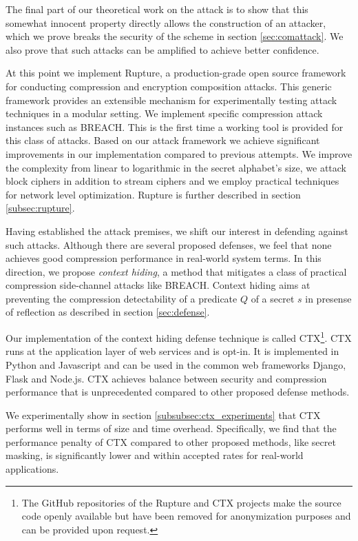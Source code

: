 \documentclass[conference, letterpaper, 10pt]{IEEEtran}
\begin{document}
The final part of our theoretical work on the attack is to show that this
somewhat innocent property directly allows the construction of an attacker,
which we prove breaks the security of the scheme in section
\ref{sec:comattack}. We also prove that such attacks can be amplified to
achieve better confidence.

At this point we implement Rupture\footnotemark[1], a production-grade open
source framework for conducting compression and encryption composition attacks.
This generic framework provides an extensible mechanism for experimentally
testing attack techniques in a modular setting. We implement specific
compression attack instances such as BREACH. This is the first time a working
tool is provided for this class of attacks.  Based on our attack framework we
achieve significant improvements in our implementation compared to previous
attempts. We improve the complexity from linear to logarithmic in the secret
alphabet's size, we attack block ciphers in addition to stream ciphers and we
employ practical techniques for network level optimization.  Rupture is further
described in section \ref{subsec:rupture}.

Having established the attack premises, we shift our interest in defending
against such attacks. Although there are several proposed defenses, we feel that
none achieves good compression performance in real-world system terms. In this
direction, we propose \textit{context hiding}, a method that mitigates a class
of practical compression side-channel attacks like BREACH. Context hiding aims
at preventing the compression detectability of a predicate $Q$ of a secret $s$
in presense of reflection as described in section \ref{sec:defense}.

Our implementation of the context hiding defense technique is called
CTX\footnote[1]{The GitHub repositories of the Rupture and CTX projects make the
source code openly available but have been removed for anonymization purposes
and can be provided upon request.}. CTX runs at the application layer of web
services and is opt-in. It is implemented in Python and Javascript and can be
used in the common web frameworks Django, Flask and Node.js. CTX achieves
balance between security and compression performance that is unprecedented
compared to other proposed defense methods.

We experimentally show in section \ref{subsubsec:ctx_experiments} that CTX
performs well in terms of size and time overhead. Specifically, we find that the
performance penalty of CTX compared to other proposed methods, like secret
masking, is significantly lower and within accepted rates for real-world
applications.
\end{document}
